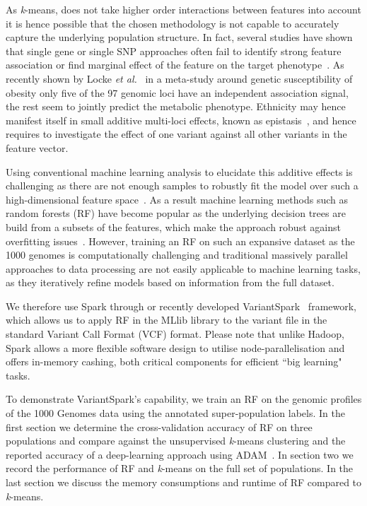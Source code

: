 \documentclass{llncs}
\newcommand{\variantSpark}{{\sc VariantSpark}}
\newcommand{\kMeans}{\textit{k}-means}
\begin{document}
{As \kMeans{}, does not take higher order interactions between features into account it is hence possible that the chosen methodology is not capable to accurately capture the underlying population structure. 
In fact, several studies have shown that single gene or single SNP approaches often fail to identify strong feature association or find marginal effect of the feature on the target phenotype~\cite{Bureau2005,Yoo2012,Qi2012}. 
As recently shown by Locke {\it et al.}~\cite{Locke2015} in a meta-study around genetic susceptibility of obesity only five of the 97 genomic loci have an independent association signal, the rest seem to jointly predict the metabolic phenotype.
Ethnicity may hence manifest itself in small additive multi-loci effects, known as epistasis~\cite{Mackay2014}, and hence requires to investigate the effect of one variant against all other variants in the feature vector.

Using conventional machine learning analysis to elucidate this additive effects is challenging as there are not enough samples to robustly fit the model over such a high-dimensional feature space~\cite{Chen2012}. 
As a result machine learning methods such as random forests (RF) have become popular as the underlying decision trees are build from a subsets of the features, which make the approach robust against overfitting issues~\cite{Breiman2001}. 
However, training an RF on such an expansive dataset as the 1000 genomes is computationally challenging and traditional massively parallel approaches to data processing are not easily applicable to machine learning tasks, as they iteratively refine models based on information from the full dataset. 


We therefore use {\sc Spark} through or recently developed \variantSpark~\cite{OBrien} framework, which allows us to apply RF in the MLlib library to the variant file in the standard Variant Call Format (VCF) format. 
Please note that unlike {\sc Hadoop}, {\sc Spark} allows a more flexible software design to utilise node-parallelisation and offers in-memory cashing, both critical components for efficient ``big learning" tasks. 

To demonstrate \variantSpark's capability, we train an RF on the genomic profiles of the 1000 Genomes data using the annotated super-population labels. 
In the first section we determine the cross-validation accuracy of RF on three populations and compare against the unsupervised \kMeans{} clustering and the reported accuracy of a deep-learning approach using {\sc ADAM}~\cite{Massie2013}.
In section two we record the performance of RF and \kMeans{} on the full set of populations. 
In the last section we discuss the memory consumptions and runtime of RF compared to \kMeans{}.


}
\end{document}
